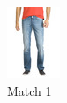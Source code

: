 \begin{figure}[H]
\begin{subfigure}[b]{0.19\textwidth}
      \includegraphics[width=\textwidth]{images/output4.jpeg}
      \caption{Match 1}
  \end{subfigure}
  \begin{subfigure}[b]{0.19\textwidth}

\end{subfigure}
\end{figure}
